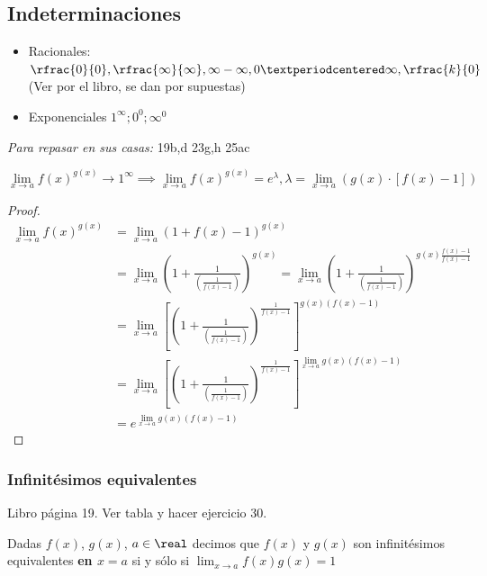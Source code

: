 \subsection{Indeterminaciones}

\begin{itemize}
	\item Racionales: $\rfrac{0}{0},\rfrac{\infty}{\infty},\infty-\infty,0·\infty, \rfrac{k}{0}$ (Ver por el libro, se dan por supuestas)
	\item Exponenciales $1^{\infty}; 0^0; \infty^0$
\end{itemize}


\begin{problem}
\textit{Para repasar en sus casas:}
\ppart 19b,d
\ppart 23g,h
\ppart 25ac
\solution
\end{problem}


\begin{prop}
\[
\lim_{x\to a}f(x)^{g(x)} \to 1^{\infty} \implies \lim_{x\to a}f(x)^{g(x)} = e^\lambda, \lambda = \lim_{x\to a} \left(g(x)·[f(x)-1]\right)
\]
\end{prop}

\begin{proof}
\begin{align*}
\lim_{x\to a}f(x)^{g(x)} &= \lim_{x\to a}(1+f(x)-1)^{g(x)}
\\
&= \lim_{x\to a}\left(1+\frac{1}{\left(\frac{1}{f(x)-1}\right)}\right)^{g(x)}
= \lim_{x\to a}\left(1+\frac{1}{\left(\frac{1}{f(x)-1}\right)}\right)^{g(x)\frac{f(x)-1}{f(x)-1}}
\\
&= \lim_{x\to a}\left[\left(1+\frac{1}{\left(\frac{1}{f(x)-1}\right)}\right)^{\frac{1}{f(x)-1}}\right]^{g(x)(f(x)-1)}
\\
&= \lim_{x\to a}\left[\left(1+\frac{1}{\left(\frac{1}{f(x)-1}\right)}\right)^{\frac{1}{f(x)-1}}\right]^{\displaystyle\lim_{x\to a}g(x)(f(x)-1)} 
\\
&= e^{\displaystyle\lim_{x\to a}g(x)(f(x)-1)}
\end{align*}
\end{proof}

\subsubsection{Infinitésimos equivalentes}

Libro página 19. Ver tabla y hacer ejercicio 30.

\begin{defn}
Dadas $f(x)$, $g(x)$, $a\in\real$ decimos que $f(x)$ y $g(x)$ son infinitésimos equivalentes \textbf{en $x=a$} si y sólo si $\displaystyle\lim_{x\to a}{f(x)}{g(x)} = 1$
\end{defn}

